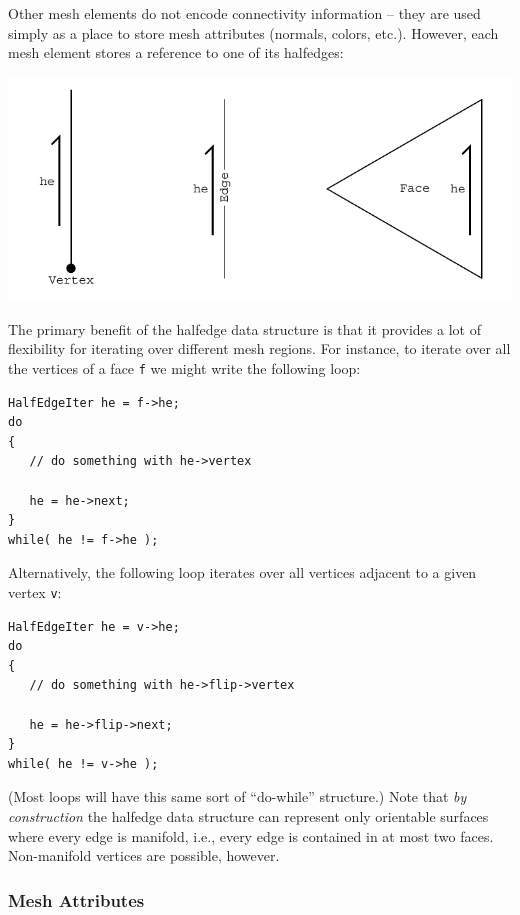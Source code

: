 \documentclass{article}
\begin{document}
Other mesh elements do not encode connectivity information -- they are used simply as a place to store mesh attributes (normals, colors, etc.).  However, each mesh element stores a reference to one of its halfedges:

\vspace{-.3in}
\begin{center}
\includegraphics{illustrations/meshelements.pdf}
\end{center}

The primary benefit of the halfedge data structure is that it provides a lot of flexibility for iterating over different mesh regions.  For instance, to iterate over all the vertices of a face \texttt{f} we might write the following loop:

\begin{verbatim}
HalfEdgeIter he = f->he;
do
{
   // do something with he->vertex

   he = he->next;
}
while( he != f->he );
\end{verbatim}

Alternatively, the following loop iterates over all vertices adjacent to a given vertex \texttt{v}:

\begin{verbatim}
HalfEdgeIter he = v->he;
do
{
   // do something with he->flip->vertex

   he = he->flip->next;
}
while( he != v->he );
\end{verbatim}

(Most loops will have this same sort of ``do-while'' structure.)  Note that \emph{by construction} the halfedge data structure can represent only orientable surfaces where every edge is manifold, i.e., every edge is contained in at most two faces.  Non-manifold vertices are possible, however.

\subsubsection{Mesh Attributes}
\end{document}
